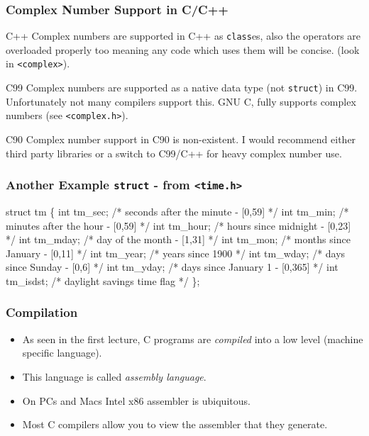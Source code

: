 \documentclass[table]{beamer}
\newif\ifschigh\schighfalse
\newcommand{\kw}[1]{\ifschigh\textcolor{red}{#1}\else\textcolor{keyword}{#1}\fi}
\newcommand{\kt}[1]{\ifschigh\textcolor{red}{#1}\else\textcolor{ctext}{#1}\fi}
\newcommand{\kc}[1]{\ifschigh\textcolor{red}{#1}\else\textcolor{comment}{#1}\fi}
\begin{document}
\begin{frame}
\frametitle{Complex Number Support in C/C++}
\begin{exampleblock}{C++}
Complex numbers are supported in C++ as {\tt \kw{class}}es, also the operators are overloaded properly too meaning any code which uses them will be concise.
(look in {\tt \kt{<complex>}}).
\end{exampleblock}

\begin{block}{C99}
Complex numbers are supported as a native data type (not {\tt \kw{struct}}) in C99. Unfortunately not many compilers support this. GNU C, fully supports complex numbers (see {\tt \kt{<complex.h>}}).
\end{block}

\begin{alertblock}{C90}
Complex number support in C90 is non-existent. I would recommend either third party libraries or a switch to C99/C++ for heavy complex number use.
\end{alertblock}
\end{frame}

\begin{frame}[fragile]
\frametitle{Another Example {\tt \kw{struct}} - from {\tt \kt{<time.h>}}}
\begin{semiverbatim}
\footnotesize
\kw{struct} tm
\{
   \kw{int} tm_sec;     \kc{/* seconds after the minute - [0,59] */}
   \kw{int} tm_min;     \kc{/* minutes after the hour - [0,59] */}
   \kw{int} tm_hour;    \kc{/* hours since midnight - [0,23] */}
   \kw{int} tm_mday;    \kc{/* day of the month - [1,31] */}
   \kw{int} tm_mon;     \kc{/* months since January - [0,11] */}
   \kw{int} tm_year;    \kc{/* years since 1900 */}
   \kw{int} tm_wday;    \kc{/* days since Sunday - [0,6] */}
   \kw{int} tm_yday;    \kc{/* days since January 1 - [0,365] */}
   \kw{int} tm_isdst;   \kc{/* daylight savings time flag */}
\};
\end{semiverbatim}
\end{frame}

\begin{frame}
\frametitle{Compilation}
\begin{itemize}
\item As seen in the first lecture, C programs are \emph{compiled} into a low level (machine specific language).
\item This language is called \emph{assembly language}.
\item On PCs and Macs Intel x86 assembler is ubiquitous.
\item Most C compilers allow you to view the assembler that they generate.
\end{itemize}
\end{frame}
\end{document}

